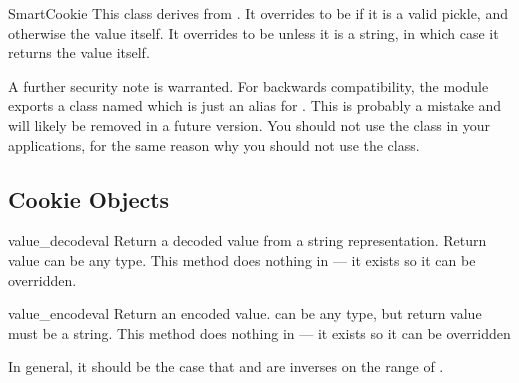 \begin{classdesc}{SmartCookie}{}
This class derives from . It overrides
 to be  if it is a
valid pickle, and otherwise the value itself. It overrides
 to be  unless it is a
string, in which case it returns the value itself.

\end{classdesc}

A further security note is warranted.  For backwards compatibility,
the  module exports a class named  which
is just an alias for .  This is probably a mistake
and will likely be removed in a future version.  You should not use
the  class in your applications, for the same reason why
you should not use the  class.


\begin{seealso}

\end{seealso}


\subsection{Cookie Objects \label{cookie-objects}}

\begin{methoddesc}[BaseCookie]{value_decode}{val}
Return a decoded value from a string representation. Return value can
be any type. This method does nothing in  --- it exists
so it can be overridden.
\end{methoddesc}

\begin{methoddesc}[BaseCookie]{value_encode}{val}
Return an encoded value.  can be any type, but return value
must be a string. This method does nothing in  --- it exists
so it can be overridden

In general, it should be the case that  and 
 are inverses on the range of .
\end{methoddesc}

